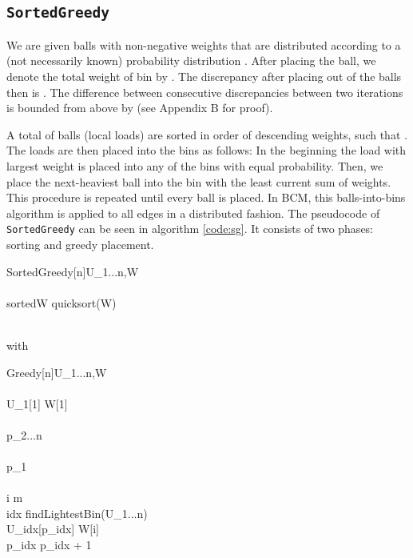 \documentclass[12pt,psfig,a4]{article}
\newcommand{\sg}{\texttt{SortedGreedy}}
\theoremstyle{plain}
\begin{document}
\subsection{\texttt{SortedGreedy}}
We are given  balls with non-negative weights  that are distributed according to a (not necessarily known) probability distribution . After placing the  ball, we denote the total weight of bin  by . The discrepancy after placing  out of the  balls then is . The difference between consecutive discrepancies between two iterations is bounded from above by  (see Appendix B for proof).

A total of  balls (local loads) are sorted in order of descending weights, such that . The loads are then placed into the bins as follows: In the beginning the load with largest weight  is placed into any of the bins with equal probability. Then, we place the next-heaviest ball into the bin with the least current sum of weights. This procedure is repeated until every ball is placed. In BCM, this balls-into-bins algorithm is applied to all edges in a distributed fashion. The pseudocode of \sg{} can be seen in algorithm \ref{code:sg}. It consists of two phases: sorting and greedy placement. \\

\begin{pseudocode}[framebox]{SortedGreedy[n]}{U_{1...n},W}
	 \\
   	 \\
   	sortedW \GETS quicksort(W)  \\
	 \\
	\label{code:sg}
  \end{pseudocode}

with

\begin{pseudocode}[framebox]{Greedy[n]}{U_{1...n},W}
	 \\
   	 \\
	U_1[1] \GETS W[1] \\
	 \\
	p_{2...n}  \\
	 \\
	p_1  \\
	
	 \\
   	\FOR i  \TO m \DO
		\BEGIN 
			 \\
			idx \GETS findLightestBin(U_{1...n}) \\
			U_{idx}[p_{idx}] \GETS W[i] \\
			p_{idx} \GETS p_{idx} + 1 \\			
		\END \\
	\label{code:gr}
  \end{pseudocode}
\end{document}
